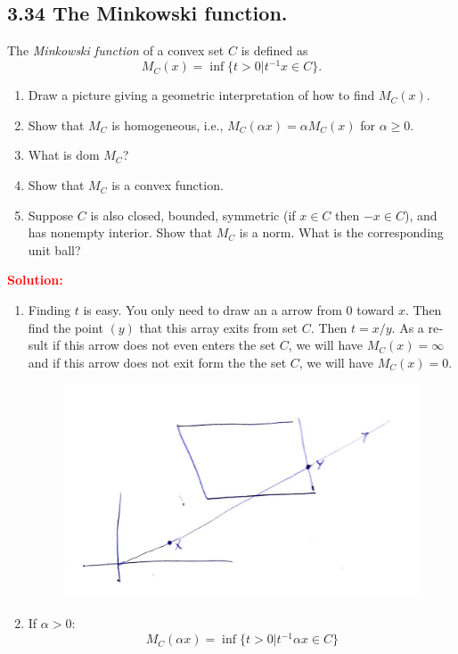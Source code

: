 \begin{latin}

\section{3.34 The Minkowski function.}

The \textit{Minkowski function} of a convex set $ C $ is defined as
\begin{equation}
	M_{C}(x) = \inf\{t > 0 | t^{-1}x \in C\}.
\end{equation}
\begin{enumerate}
	\item Draw a picture giving a geometric interpretation of how to find $ M_{C}(x) $.
	\item Show that $ M_{C} $ is homogeneous, i.e., $ M_{C}(\alpha x) = \alpha M_{C}(x) $ for $ \alpha \geq 0 $.
	\item What is dom $ M_{C} $?
	\item Show that $ M_{C} $ is a convex function.
	\item Suppose $ C $ is also closed, bounded, symmetric (if $ x \in C $ then $ -x \in C $), and has nonempty interior. Show that $ M_{C} $ is a norm. What is the corresponding unit ball?
\end{enumerate}
\textcolor{red}{\textbf{Solution:}}
\\
\begin{enumerate}
	\item Finding $ t $ is easy. You only need to draw an a arrow from $ 0 $ toward $ x $. Then find the point $ (y) $ that this array exits from set $ C $. Then $ t = x/y $. As a result if this arrow does not even enters the set $ C $, we will have $ M_{C}(x) = \infty $ and  if this arrow does not exit form the the set $ C $, we will have $ M_{C}(x) = 0 $.
	\begin{figure}[H]
		\centering
		\includegraphics[width=0.45\linewidth]{Q4_Img}
	\end{figure}
	\item If $ \alpha > 0 $:
	\begin{equation*}
			M_{C}(\alpha x) = \inf \{t > 0 | t^{-1} \alpha x \in C\}

\end{equation*}
\end{enumerate}
\end{latin}
